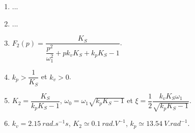 

\begin{enumerate}
\item ...
\item ...
\item $F_2(p)=\dfrac{K_S}{\dfrac{p^2}{\omega_1^2}+pk_v K_S +k_pK_S - 1}$.
\item $k_p>\dfrac{1}{K_S}$ et $k_v>0$.
\item $K_2 = \dfrac{K_S}{k_p K_S - 1}$, $\omega_0 = \omega_1\sqrt{k_p K_S - 1}$ et $\xi = \dfrac{1}{2}\dfrac{k_vK_S\omega_1}{\sqrt{k_p K_S - 1}}$.
\item $k_v = \SI{2,15}{rad.s^{-1}s}$, $K_2 \simeq \SI{0,1}{rad.V^{-1}}$, $k_p \simeq \SI{13,54}{V.rad^{-1}}$.
\end{enumerate}